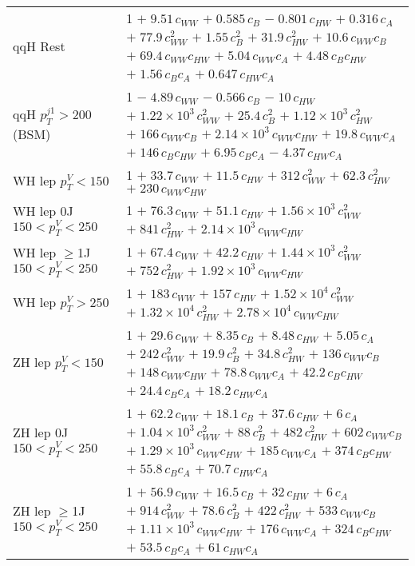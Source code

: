 \begin{tabular}{l|p{}}
    qqH Rest & 1 $+\;9.51\,c_{WW}$ $+\;0.585\,c_{B}$ $-\;0.801\,c_{HW}$ $+\;0.316\,c_{A}$ $+\;77.9\,c_{WW}^{2}$ $+\;1.55\,c_{B}^{2}$ $+\;31.9\,c_{HW}^{2}$ $+\;10.6\,c_{WW}c_{B}$ $+\;69.4\,c_{WW}c_{HW}$ $+\;5.04\,c_{WW}c_{A}$ $+\;4.48\,c_{B}c_{HW}$ $+\;1.56\,c_{B}c_{A}$ $+\;0.647\,c_{HW}c_{A}$ \\
    qqH $p_{T}^{j1} > 200$ (BSM) & 1 $-\;4.89\,c_{WW}$ $-\;0.566\,c_{B}$ $-\;10\,c_{HW}$ $+\;1.22\times 10^{3}\,c_{WW}^{2}$ $+\;25.4\,c_{B}^{2}$ $+\;1.12\times 10^{3}\,c_{HW}^{2}$ $+\;166\,c_{WW}c_{B}$ $+\;2.14\times 10^{3}\,c_{WW}c_{HW}$ $+\;19.8\,c_{WW}c_{A}$ $+\;146\,c_{B}c_{HW}$ $+\;6.95\,c_{B}c_{A}$ $-\;4.37\,c_{HW}c_{A}$ \\
    \hline
    WH lep $p_{T}^{V} < 150$ & 1 $+\;33.7\,c_{WW}$ $+\;11.5\,c_{HW}$ $+\;312\,c_{WW}^{2}$ $+\;62.3\,c_{HW}^{2}$ $+\;230\,c_{WW}c_{HW}$ \\
    WH lep 0J $150 < p_{T}^{V} < 250$ & 1 $+\;76.3\,c_{WW}$ $+\;51.1\,c_{HW}$ $+\;1.56\times 10^{3}\,c_{WW}^{2}$ $+\;841\,c_{HW}^{2}$ $+\;2.14\times 10^{3}\,c_{WW}c_{HW}$ \\
    WH lep $\geq$1J $150 < p_{T}^{V} < 250$ & 1 $+\;67.4\,c_{WW}$ $+\;42.2\,c_{HW}$ $+\;1.44\times 10^{3}\,c_{WW}^{2}$ $+\;752\,c_{HW}^{2}$ $+\;1.92\times 10^{3}\,c_{WW}c_{HW}$ \\
    WH lep $p_{T}^{V} > 250$ & 1 $+\;183\,c_{WW}$ $+\;157\,c_{HW}$ $+\;1.52\times 10^{4}\,c_{WW}^{2}$ $+\;1.32\times 10^{4}\,c_{HW}^{2}$ $+\;2.78\times 10^{4}\,c_{WW}c_{HW}$ \\
    \hline
    ZH lep $p_{T}^{V} < 150$ & 1 $+\;29.6\,c_{WW}$ $+\;8.35\,c_{B}$ $+\;8.48\,c_{HW}$ $+\;5.05\,c_{A}$ $+\;242\,c_{WW}^{2}$ $+\;19.9\,c_{B}^{2}$ $+\;34.8\,c_{HW}^{2}$ $+\;136\,c_{WW}c_{B}$ $+\;148\,c_{WW}c_{HW}$ $+\;78.8\,c_{WW}c_{A}$ $+\;42.2\,c_{B}c_{HW}$ $+\;24.4\,c_{B}c_{A}$ $+\;18.2\,c_{HW}c_{A}$ \\
    ZH lep 0J $150 < p_{T}^{V} < 250$ & 1 $+\;62.2\,c_{WW}$ $+\;18.1\,c_{B}$ $+\;37.6\,c_{HW}$ $+\;6\,c_{A}$ $+\;1.04\times 10^{3}\,c_{WW}^{2}$ $+\;88\,c_{B}^{2}$ $+\;482\,c_{HW}^{2}$ $+\;602\,c_{WW}c_{B}$ $+\;1.29\times 10^{3}\,c_{WW}c_{HW}$ $+\;185\,c_{WW}c_{A}$ $+\;374\,c_{B}c_{HW}$ $+\;55.8\,c_{B}c_{A}$ $+\;70.7\,c_{HW}c_{A}$ \\
    ZH lep $\geq$1J $150 < p_{T}^{V} < 250$ & 1 $+\;56.9\,c_{WW}$ $+\;16.5\,c_{B}$ $+\;32\,c_{HW}$ $+\;6\,c_{A}$ $+\;914\,c_{WW}^{2}$ $+\;78.6\,c_{B}^{2}$ $+\;422\,c_{HW}^{2}$ $+\;533\,c_{WW}c_{B}$ $+\;1.11\times 10^{3}\,c_{WW}c_{HW}$ $+\;176\,c_{WW}c_{A}$ $+\;324\,c_{B}c_{HW}$ $+\;53.5\,c_{B}c_{A}$ $+\;61\,c_{HW}c_{A}$ \\

\end{tabular}

